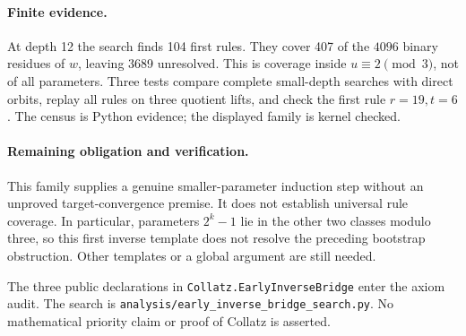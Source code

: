 \documentclass[10pt]{article}
\begin{document}
\paragraph{Finite evidence.}
At depth 12 the search finds 104 first rules. They cover 407 of the
$4096$ binary residues of $w$, leaving 3689 unresolved. This is coverage
inside $u\equiv2\pmod3$, not of all parameters. Three tests compare complete
small-depth searches with direct orbits, replay all rules on three quotient
lifts, and check the first rule $r=19,t=6$.
The census is Python evidence; the displayed family is kernel checked.

\paragraph{Remaining obligation and verification.}
This family supplies a genuine smaller-parameter induction step without an
unproved target-convergence premise. It does not establish universal rule
coverage. In particular, parameters $2^k-1$ lie in the other two classes
modulo three, so this first inverse template does not resolve the preceding
bootstrap obstruction. Other templates or a global argument are still needed.
\begingroup\raggedright
The three public declarations in \texttt{Collatz.EarlyInverseBridge} enter
the axiom audit. The search is \texttt{analysis/early\_inverse\_bridge\_search.py}.
No mathematical priority claim or proof of Collatz is asserted.
\par\endgroup
\end{document}
